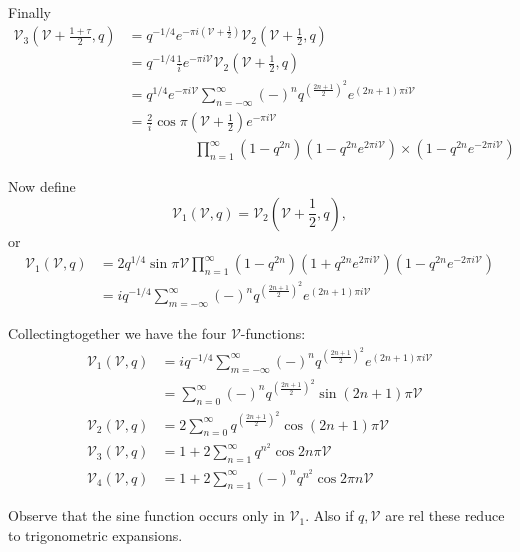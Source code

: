 Finally\pageoriginale
\begin{align*}
  \mathscr{V}_3 (\mathscr{V}+ \frac{1+\tau}{2}, q) & = q^{-1/4} e^{-
    \pi i (\mathscr{V}+\frac{1}{2})} \mathscr{V}_2 \left(\mathscr{V}+
  \frac{1}{2}, q\right)\\
    & = q^{-1/4} \frac{1}{i} e^{- \pi i \mathscr{V}} \mathscr{V}_2
  \left(\mathscr{V}+ \frac{1}{2}, q\right)\\
  & = q^{1/4} e^{- \pi i \mathscr{V}} \sum^\infty_{n=- \infty} (-)^n
  q^{\left( \frac{2n+1}{2}\right)^2} e^{(2n+1) \pi i \mathscr{V}}\\
  & = \frac{2}{i} \cos \pi \left(\mathscr{V}+ \frac{1}{2}\right)
  e^{-\pi i \mathscr{V}}\\ 
  & \hspace{2cm}\prod^\infty_{n=1} (1- q^{2n})\left(1- q^{2n} e^{2
    \pi i \mathscr{V}}\right)\times  \left(1 - q^{2n} e^{-2 \pi i
    \mathscr{V}}\right)  
\end{align*}

Now define
$$
\mathscr{V}_1 (\mathscr{V}, q)= \mathscr{V}_2 \left(\mathscr{V}+
\frac{1}{2}, q\right),
$$
or
\begin{align*}
  \mathscr{V}_1 (\mathscr{V}, q) & = 2q^{1/4} \sin \pi \mathscr{V}
  \prod^\infty_{n=1} (1- q^{2n}) (1+ q^{2n} e^{2 \pi i \mathscr{V}})
  (1- q^{2n} e^{- 2 \pi i \mathscr{V}})\\
  & = i q^{-1/4} \sum^\infty_{m=-\infty} (-)^n q^{\left(\frac{2n+1}{2}
    \right)^2} e^{(2n+1)\pi i \mathscr{V}}
\end{align*}

Collecting\pageoriginale together we have the four
$\mathscr{V}$-functions:
\begin{align*}
  \mathscr{V}_1 (\mathscr{V}, q) & = i q^{-1/4} \sum^\infty_{m=-\infty}
  (-)^n q^{\left( \frac{2n+1}{2}\right)^2} e^{(2n+1)\pi i \mathscr{V}}\\
  & = \sum^\infty_{n=0} (-)^n q^{\left( \frac{2n+1}{2}\right)^2} \sin
  (2n+1) \pi \mathscr{V}\\
  \mathscr{V}_2 (\mathscr{V}, q) & = 2 \sum^\infty_{n=0}
    q^{\left(\frac{2n+1}{2} \right)^2} \cos (2n+1) \pi \mathscr{V}\\
  \mathscr{V}_3 (\mathscr{V}, q) & = 1+ 2 \sum^\infty_{n=1} q^{n^2}
  \cos 2 n \pi \mathscr{V}\\
  \mathscr{V}_4 (\mathscr{V}, q) & = 1+ 2 \sum^\infty_{n=1} (-)^n
  q^{n^2} \cos 2 \pi n \mathscr{V}
\end{align*}

Observe that the sine function occurs only in $\mathscr{V}_1$. Also if
$q, \mathscr{V}$ are rel these reduce to trigonometric expansions. 
